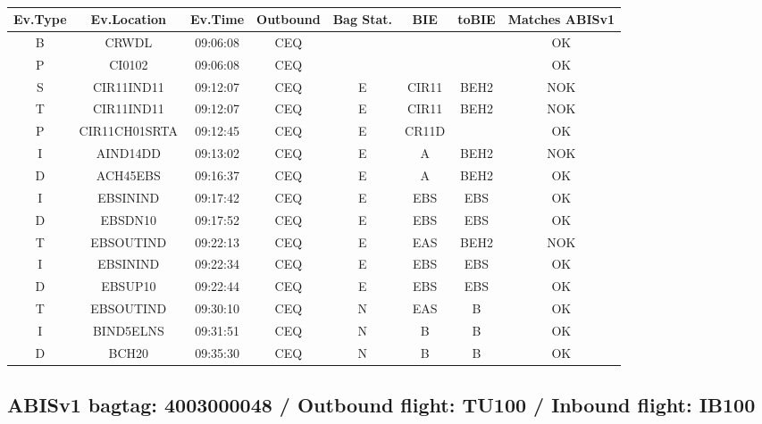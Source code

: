 \documentclass{report}
\begin{document}
\paragraph{}
\begin{longtable}{cccccccc}    \toprule
\rowcolor{white!50}
\textbf{Ev.Type} & \textbf{Ev.Location} & \textbf{Ev.Time} & \textbf{Outbound} & \textbf{Bag Stat.} & \textbf{BIE} & \textbf{toBIE} & \textbf{Matches ABISv1} \\\midrule
B & CRWDL & 09:06:08  & CEQ &  &  &  & OK\\
P & CI0102 & 09:06:08  & CEQ &  &  &  & OK\\
S & CIR11IND11 & 09:12:07  & CEQ & E & CIR11 & BEH2 & NOK\\
T & CIR11IND11 & 09:12:07  & CEQ & E & CIR11 & BEH2 & NOK\\
P & CIR11CH01SRTA & 09:12:45  & CEQ & E & CR11D &  & OK\\
I & AIND14DD & 09:13:02  & CEQ & E & A & BEH2 & NOK\\
D & ACH45EBS & 09:16:37  & CEQ & E & A & BEH2 & OK\\
I & EBSININD & 09:17:42  & CEQ & E & EBS & EBS & OK\\
D & EBSDN10 & 09:17:52  & CEQ & E & EBS & EBS & OK\\
T & EBSOUTIND & 09:22:13  & CEQ & E & EAS & BEH2 & NOK\\
I & EBSININD & 09:22:34  & CEQ & E & EBS & EBS & OK\\
D & EBSUP10 & 09:22:44  & CEQ & E & EBS & EBS & OK\\
T & EBSOUTIND & 09:30:10  & CEQ & N & EAS & B & OK\\
I & BIND5ELNS & 09:31:51  & CEQ & N & B & B & OK\\
D & BCH20 & 09:35:30  & CEQ & N & B & B & OK\\
\bottomrule
\end{longtable}
\subsection*{ABISv1 bagtag: 4003000048 / Outbound flight: TU100 / Inbound flight: IB100}
\end{document}
